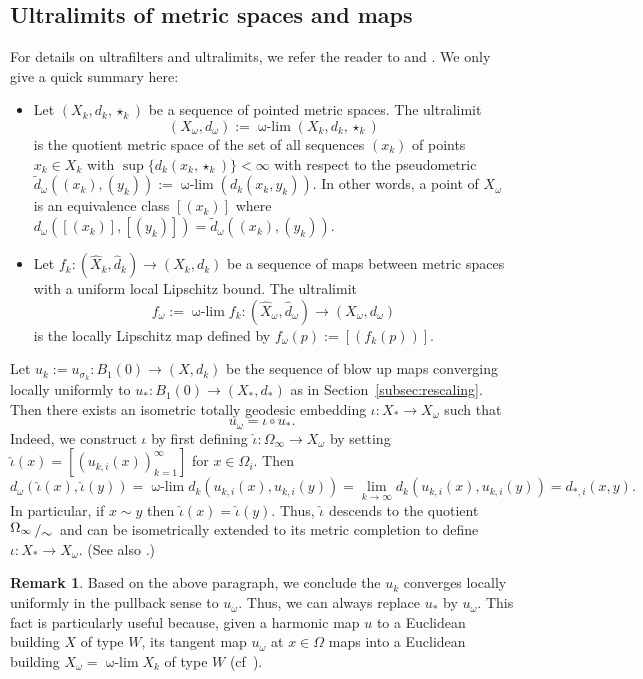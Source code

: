 \documentclass[12pt]{amsart}
\theoremstyle{definition}
\newtheorem{remark}[theorem]{Remark}
\numberwithin{equation}{section}
\newcommand\wlim{\mathop{\mbox{$\omega$-$\lim$}}}
\begin{document}
\subsection{Ultralimits of metric spaces and maps}
\label{sec:ultra}
For details on  ultrafilters and ultralimits, we refer the reader to \cite[Section 2.4]{kleiner-leeb} and  \cite[Section 3.3]{lytchak}.  We only give a quick summary here:  
\begin{itemize}
\item Let  $(X_k,d_k,\star_k)$ be a sequence of  pointed metric spaces.    The ultralimit 
$$
(X_\omega,d_\omega):=\wlim (X_k,d_k,\star_k)
$$ is the quotient metric space of  the set of all sequences $(x_k)$ of points $x_k \in X_k$ with $\sup\{d_k(x_k, \star_k)\}<\infty$ with respect to  the pseudometric $\tilde d_\omega((x_k), (y_k)):= \wlim (d_k(x_k,y_k))$.  In other words, a point of $X_\omega$ is an equivalence class $[(x_k)]$ where $d_\omega([(x_k)],  [(y_k)])=\tilde d_\omega((x_k),(y_k))$.
\item Let $f_k: (\widehat X_k, \widehat d_k) \rightarrow (X_k,d_k)$ be a sequence of maps between metric spaces with a uniform local Lipschitz bound.  The ultralimit 
$$
f_\omega:=\wlim f_k: (\widehat X_\omega, \widehat d_\omega)  \to  (X_\omega, d_\omega)
$$  is the  locally Lipschitz map defined by $f_\omega(p):=[(f_k(p))]$.
\end{itemize}


Let $u_k:=u_{\sigma_k}:B_1(0) \rightarrow (X,d_k)$ be the sequence of blow up maps converging locally uniformly to $u_*:B_1(0) \to (X_*,d_*)$ as in Section~\ref{subsec:rescaling}.  Then there exists an isometric totally geodesic embedding 
$
\iota: X_* \to X_\omega 
$
such that  
\[
u_\omega =\iota \circ u_*.
\] 
Indeed, we construct $\iota$ by first defining $\hat \iota:\Omega_\infty \rightarrow X_\omega$ by setting $\hat \iota(x)=[(u_{k,i}(x))_{k=1}^{\infty}]$ for $x \in \Omega_i$.  Then 
$$ d_\omega(\hat \iota(x), \hat \iota(y)) = \wlim d_{k} (u_{k,i}(x), u_{k,i}(y)) = \lim_{k \rightarrow \infty} d_{k}(u_{k,i}(x), u_{k,i}(y)) =d_{*,i}(x,y).
$$
In particular, if $x\sim y$ then $\hat\iota(x)=\hat\iota(y)$.  Thus,   $\hat\iota$ descends to the quotient $\bigslant{\Omega_\infty}{\sim}$ and  can be  isometrically extended to its metric completion to define $\iota:X_* \to X_\omega$.  (See also \cite{kim}.)
\begin{remark}
\label{KLTheorem5.1}
Based on the above paragraph, we conclude the $u_k$  converges locally uniformly in the pullback sense to $u_\omega$.  {Thus, we can always replace $u_*$ by $u_\omega$.}  This fact is particularly useful because,  given a harmonic map $u$ to a Euclidean building $X$ of type $W$,   its tangent map  $u_\omega$ at $x \in \Omega$ maps into a Euclidean building $X_\omega=\wlim X_k$ of type $W$ (cf~\cite[Theorem 5.1.1]{kleiner-leeb}).
\end{remark}
\end{document}
